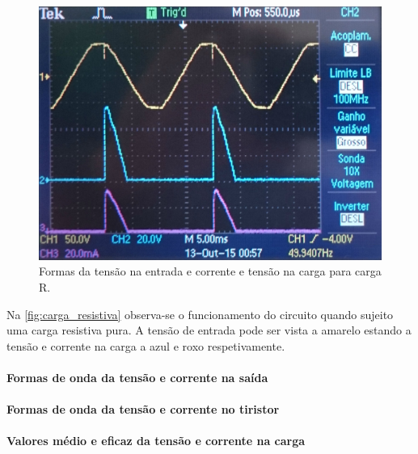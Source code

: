 \documentclass[a4paper,11pt]{article}
\numberwithin{equation}{section}
\begin{document}
\begin{figure}[h]
	\centering
	\includegraphics[keepaspectratio=true, scale=0.12]{img/figs/carga_resistiva}
	\caption{Formas da tensão na entrada e corrente e tensão na carga para carga R.}
	\label{fig:carga_resistiva}
	\vspace{-0.8em}
\end{figure}


Na \autoref{fig:carga_resistiva} observa-se o funcionamento do circuito quando sujeito uma carga resistiva pura. A tensão de entrada pode ser vista a amarelo estando a tensão e corrente na carga a azul e roxo respetivamente.

\paragraph{Formas de onda da tensão e corrente na saída}



\paragraph{Formas de onda da tensão e corrente no tiristor}


\paragraph{Valores médio e eficaz da tensão e corrente na carga}
\end{document}
